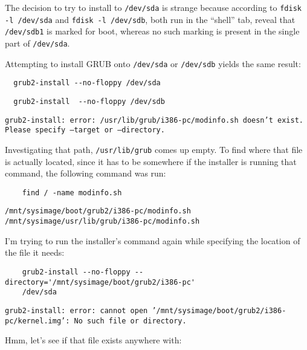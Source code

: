 \documentclass[12pt]{article}
\begin{document}
The decision to try to install to {\tt /dev/sda} is strange because according to
{\tt fdisk -l /dev/sda} and {\tt fdisk -l /dev/sdb}, both run in the ``shell''
tab, reveal that {\tt /dev/sdb1} is marked for boot, whereas no such marking is
present in the single part of {\tt /dev/sda}.

\qq Attempting to install GRUB onto {\tt /dev/sda} or {\tt /dev/sdb} yields the
same result:

\begin{tcolorbox}[colback=white, colframe=black]
\begin{verbatim}
  grub2-install --no-floppy /dev/sda
\end{verbatim}
\begin{verbatim}
  grub2-install  --no-floppy /dev/sdb
\end{verbatim}
\tcblower
{\tt grub2-install: error: /usr/lib/grub/i386-pc/modinfo.sh doesn't
  exist. Please specify --target or --directory.}
\end{tcolorbox}

Investigating that path, {\tt /usr/lib/grub} comes up empty. To
find where that file is actually located, since it has to be somewhere if the
installer is running that command, the following command was run:

\begin{tcolorbox}[colback=white, colframe=black]
  \begin{verbatim}
    find / -name modinfo.sh
  \end{verbatim}
  \tcblower
  {\tt /mnt/sysimage/boot/grub2/i386-pc/modinfo.sh}\\

  {\tt /mnt/sysimage/usr/lib/grub/i386-pc/modinfo.sh}
\end{tcolorbox}

\qq I'm trying to run the installer's command again while specifying the
location of the file it needs:

\begin{tcolorbox}[colback=white, colframe=black]
  \begin{verbatim}
    grub2-install --no-floppy --directory='/mnt/sysimage/boot/grub2/i386-pc'
    /dev/sda
  \end{verbatim}
  \tcblower
  {\tt grub2-install: error: cannot open
    '/mnt/sysimage/boot/grub2/i386-pc/kernel.img': No such file or
    directory.}
\end{tcolorbox}

Hmm, let's see if that file exists anywhere with:
\end{document}
